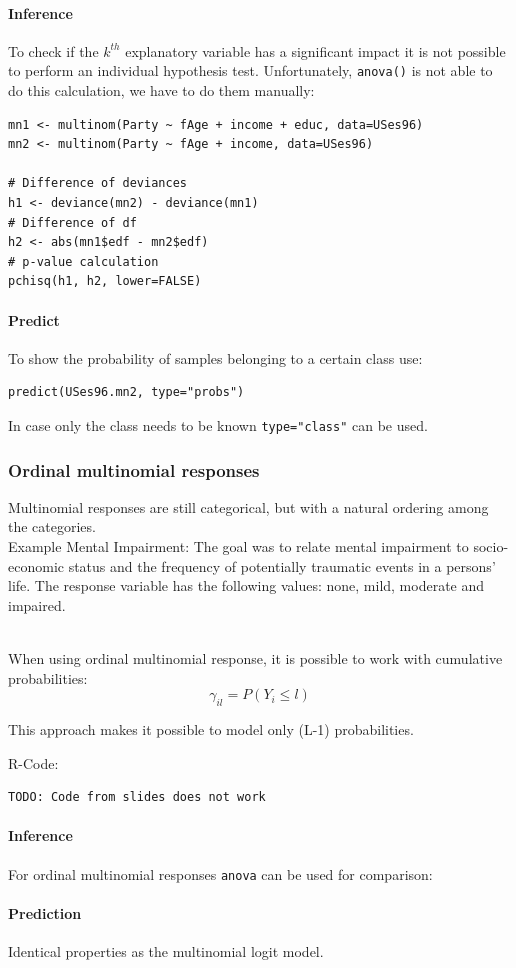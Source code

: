 \paragraph{Inference}
To check if the $k^{th}$ explanatory variable has a significant impact it is not possible to perform an individual hypothesis test. Unfortunately, \lstinline{anova()} is not able to do this calculation, we have to do them manually:
\begin{lstlisting}
mn1 <- multinom(Party ~ fAge + income + educ, data=USes96)
mn2 <- multinom(Party ~ fAge + income, data=USes96)

# Difference of deviances
h1 <- deviance(mn2) - deviance(mn1)
# Difference of df
h2 <- abs(mn1$edf - mn2$edf)
# p-value calculation
pchisq(h1, h2, lower=FALSE)
\end{lstlisting}

\paragraph{Predict}
To show the probability of samples belonging to a certain class use:
\begin{lstlisting}
predict(USes96.mn2, type="probs")
\end{lstlisting}
In case only the class needs to be known \lstinline{type="class"} can be used.

\subsubsection{Ordinal multinomial responses}
Multinomial responses are still categorical, but with a natural ordering among the categories.\\
Example Mental Impairment: The goal was to relate mental impairment to socio-economic status and the frequency of potentially traumatic events in a persons’ life. The response variable has the following values: none, mild, moderate and impaired.

\mbox{}\\
When using ordinal multinomial response, it is possible to work with cumulative probabilities:
\begin{equation*}
\gamma_{il} = P(Y_i\leq l)
\end{equation*}

This approach makes it possible to model only (L-1) probabilities.

R-Code:
\begin{lstlisting}
TODO: Code from slides does not work
\end{lstlisting}

\paragraph{Inference}
For ordinal multinomial responses \lstinline{anova} can be used for comparison:

\paragraph{Prediction}
Identical properties as the multinomial logit model.
